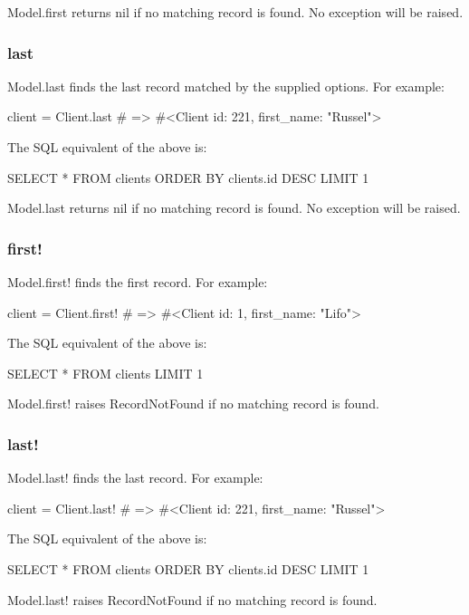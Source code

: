\documentclass[10pt]{book}
\newenvironment{code}{%
  \scriptsize
    \verbatim
}{%
    \endverbatim
    \newline
}
\begin{document}
Model.first returns nil if no matching record is found. No exception will be raised.

\subsubsection{ last}

Model.last finds the last record matched by the supplied options. For example:
\begin{code}
client = Client.last
# => #<Client id: 221, first_name: "Russel">
\end{code}

The SQL equivalent of the above is:
\begin{code}
SELECT * FROM clients ORDER BY clients.id DESC LIMIT 1
\end{code}

Model.last returns nil if no matching record is found. No exception will be raised.

\subsubsection{ first!}

Model.first! finds the first record. For example:
\begin{code}
client = Client.first!
# => #<Client id: 1, first_name: "Lifo">
\end{code}

The SQL equivalent of the above is:
\begin{code}
SELECT * FROM clients LIMIT 1
\end{code}

Model.first! raises RecordNotFound if no matching record is found.

\subsubsection{ last!}

Model.last! finds the last record. For example:
\begin{code}
client = Client.last!
# => #<Client id: 221, first_name: "Russel">
\end{code}

The SQL equivalent of the above is:
\begin{code}
SELECT * FROM clients ORDER BY clients.id DESC LIMIT 1
\end{code}

Model.last! raises RecordNotFound if no matching record is found.
\end{document}
